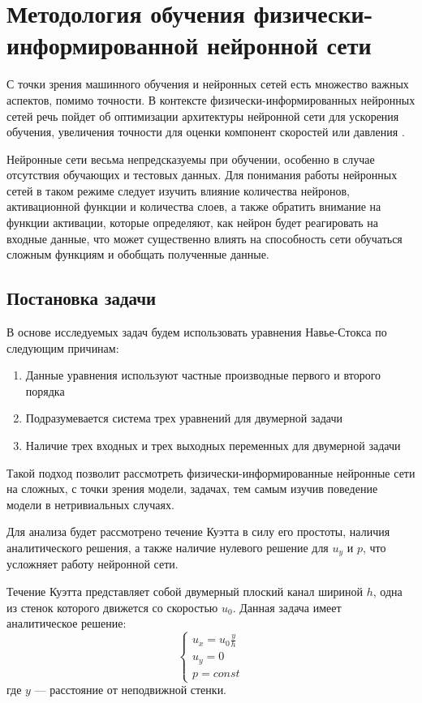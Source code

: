 \chapter{Методология обучения физически-информированной нейронной сети}
С точки зрения машинного обучения и нейронных сетей есть множество важных аспектов,
помимо точности. В контексте физически-информированных нейронных сетей речь пойдет
об оптимизации архитектуры нейронной сети для ускорения обучения, увеличения точности
для оценки компонент скоростей или давления \cite{Tommaso2024pinn}.

Нейронные сети весьма непредсказуемы при обучении, особенно в случае отсутствия
обучающих и тестовых данных. Для понимания работы нейронных сетей в таком режиме
следует изучить влияние количества нейронов, активационной функции и количества слоев,
а также обратить внимание на функции активации, которые определяют,
как нейрон будет реагировать на входные данные, что может существенно влиять на способность
сети обучаться сложным функциям и обобщать полученные данные.
\section{Постановка задачи}
В основе исследуемых задач будем использовать уравнения Навье-Стокса по следующим
причинам:
\begin{enumerate}
    \item Данные уравнения используют частные производные первого и второго порядка
    \item Подразумевается система трех уравнений для двумерной задачи
    \item Наличие трех входных и трех выходных переменных для двумерной задачи
\end{enumerate}
Такой подход позволит рассмотреть физически-информированные нейронные сети на сложных,
с точки зрения модели, задачах, тем самым изучив поведение модели в нетривиальных случаях.

Для анализа будет рассмотрено течение Куэтта в силу его простоты, наличия аналитического
решения, а также наличие нулевого решение для $u_y$ и $p$, что усложняет работу нейронной
сети.

Течение Куэтта представляет собой двумерный плоский канал шириной $h$, одна из стенок которого 
движется со скоростью $u_0$. Данная задача имеет аналитическое решение:
\begin{equation}
    \begin{cases}
        u_x = u_0 \frac{y}{h} \\
        u_y = 0 \\
        p = const
    \end{cases}
\end{equation}
где $y$ --- расстояние от неподвижной стенки.

